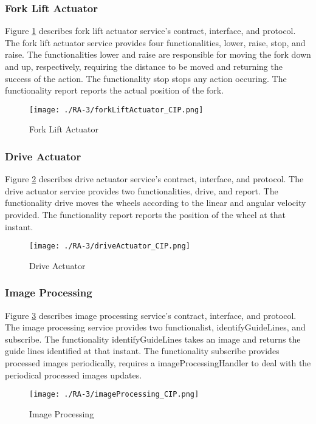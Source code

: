 \subsubsection{Fork Lift Actuator} %
Figure \ref{fig:forkliftactuator_cip} describes fork lift actuator service's contract, interface, and protocol. The fork lift actuator service provides four functionalities, lower, raise, stop, and raise. The functionalities lower and raise are responsible for moving the fork down and up, respectively, requiring the distance to be moved and returning the success of the action. The functionality stop stops any action occuring. The functionality report reports the actual position of the fork.
\begin{figure}[ht!]
 \centering
 \texttt{[image: ./RA-3/forkLiftActuator\_CIP.png]}
 \caption{Fork Lift Actuator}
 \label{fig:forkliftactuator_cip}
\end{figure}

\subsubsection{Drive Actuator} %
Figure \ref{fig:driveactuator_cip} describes drive actuator service's contract, interface, and protocol. The drive actuator service provides two functionalities, drive, and report. The functionality drive moves the wheels according to the linear and angular velocity provided. The functionality report reports the position of the wheel at that instant.
\begin{figure}[ht!]
 \centering
 \texttt{[image: ./RA-3/driveActuator\_CIP.png]}
 \caption{Drive Actuator}
 \label{fig:driveactuator_cip}
\end{figure}

\subsubsection{Image Processing} %
Figure \ref{fig:imageprocessing_cip} describes image processing service's contract, interface, and protocol. The image processing service provides two functionalist, identifyGuideLines, and subscribe. The functionality identifyGuideLines takes an image and returns the guide lines identified at that instant. The functionality subscribe provides processed images periodically, requires a imageProcessingHandler to deal with the periodical processed images updates. 
\begin{figure}[ht!]
 \centering
 \texttt{[image: ./RA-3/imageProcessing\_CIP.png]}
 \caption{Image Processing}
 \label{fig:imageprocessing_cip}
\end{figure}

